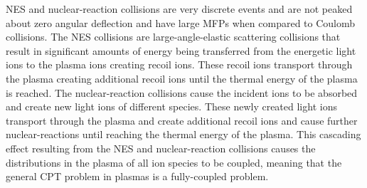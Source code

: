 NES and nuclear-reaction collisions are very discrete events and are not peaked about zero angular deflection and have large MFPs when compared to Coulomb collisions. The NES collisions are large-angle-elastic scattering collisions that result in significant amounts of energy being transferred from the energetic light ions to the plasma ions creating recoil ions. These recoil ions transport through the plasma creating additional recoil ions until the thermal energy of the plasma is reached. The nuclear-reaction collisions cause the incident ions to be absorbed and create new light ions of different species. These newly created light ions transport through the plasma and create additional recoil ions and cause further nuclear-reactions until reaching the thermal energy of the plasma. This cascading effect resulting from the NES and nuclear-reaction collisions causes the distributions in the plasma of all ion species to be coupled, meaning that the general CPT problem in plasmas is a fully-coupled problem.
